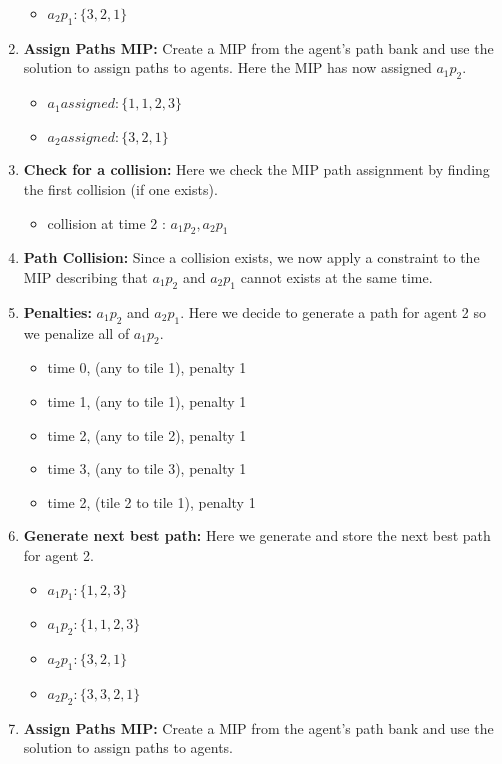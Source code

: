 \documentclass[a4paper,11pt]{article}
\begin{document}
\begin{enumerate}
\begin{itemize}
		\item $a_2p_1: \{3, 2, 1\}$
	\end{itemize}
	\item \textbf{Assign Paths MIP:} Create a MIP from the agent's path bank and use the solution to assign paths to agents. Here the MIP has now assigned $a_1p_2$.
	\begin{itemize}
		\item $a_1assigned: \{1, 1, 2, 3\}$
		\item $a_2assigned: \{3, 2, 1\}$
	\end{itemize}
	\item \textbf{Check for a collision:} Here we check the MIP path assignment by finding the first collision (if one exists). 
	\begin{itemize}
		\item collision at time 2 : $a_1p_2, a_2p_1$
	\end{itemize}
	\item \textbf{Path Collision:} Since a collision exists, we now apply a constraint to the MIP describing that $a_1p_2$ and $a_2p_1$ cannot exists at the same time.
	\item \textbf{Penalties:} $a_1p_2$ and $a_2p_1$. Here we decide to generate a path for agent 2 so we penalize all of $a_1p_2$.
	\begin{itemize}
		\item time 0, (any to tile 1), penalty 1
		\item time 1, (any to tile 1), penalty 1
		\item time 2, (any to tile 2), penalty 1
		\item time 3, (any to tile 3), penalty 1
		\item time 2, (tile 2 to tile 1), penalty 1
	\end{itemize}
	\item \textbf{Generate next best path:} Here we generate and store the next best path for agent 2.
	\begin{itemize}
		\item $a_1p_1: \{1, 2, 3\}$
		\item $a_1p_2: \{1, 1, 2, 3\}$
		\item $a_2p_1: \{3, 2, 1\}$
		\item $a_2p_2: \{3, 3, 2, 1\}$
	\end{itemize}
		\item \textbf{Assign Paths MIP:} Create a MIP from the agent's path bank and use the solution to assign paths to agents.
	\begin{itemize}

\end{itemize}
\end{enumerate}
\end{document}
